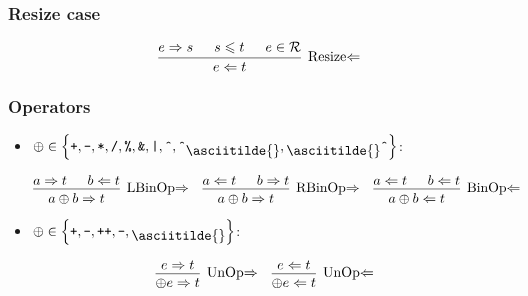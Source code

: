 \documentclass{article}
\newcommand{\mytilde}{\raisebox{-.7ex}{\asciitilde{}}}
\newcommand{\binOp}{\ensuremath{\left\{
      \texttt{+}, \texttt{-}, \texttt{*}, \texttt{/}, \texttt{\%}, \texttt{\&},
      \texttt{|}, \texttt{\^{}}, \texttt{\^{}}\mytilde, \mytilde\texttt{\^{}}
      \right\}}}
\newcommand{\unOp}{\ensuremath{\left\{
      \texttt{+}, \texttt{-}, \texttt{++}, \texttt{--}, \mytilde
    \right\}}}
\renewcommand{\S}{\ensuremath{\Rightarrow}}
\newcommand{\C}{\ensuremath{\Leftarrow}}
\newcommand{\s}[2]{#1 \S{} #2}
\renewcommand{\c}[2]{#1 \C{} #2}
\begin{document}
\subsubsection*{Resize case}

\begin{equation*}
    \begin{prooftree}
        \hypo{\s{e}{s}}
        \hypo{s \leqslant t}
        \hypo{e \in \mathcal{R}}
        \infer3[Resize\C]{\c{e}{t}}
    \end{prooftree}
\end{equation*}

\subsubsection*{Operators}

\begin{itemize}[leftmargin=*]
    \setlength{\itemsep}{2em}

    \item $\oplus \in \binOp$:

          \begin{align*}
               &
              \begin{prooftree}
                  \hypo{\s{a}{t}}
                  \hypo{\c{b}{t}}
                  \infer2[LBinOp\S]{\s{a\oplus b}{t}}
              \end{prooftree}
               &
               &
              \begin{prooftree}
                  \hypo{\c{a}{t}}
                  \hypo{\s{b}{t}}
                  \infer2[RBinOp\S]{\s{a\oplus b}{t}}
              \end{prooftree}
               &
               &
              \begin{prooftree}
                  \hypo{\c{a}{t}}
                  \hypo{\c{b}{t}}
                  \infer2[BinOp\C]{\c{a\oplus b}{t}}
              \end{prooftree}
          \end{align*}

    \item $\oplus \in \unOp$:

          \begin{align*}
               &
              \begin{prooftree}
                  \hypo{\s{e}{t}}
                  \infer1[UnOp\S]{\s{\oplus e}{t}}
              \end{prooftree}
               &
               &
              \begin{prooftree}
                  \hypo{\c{e}{t}}
                  \infer1[UnOp\C]{\c{\oplus e}{t}}
              \end{prooftree}
          \end{align*}


\end{itemize}
\end{document}
